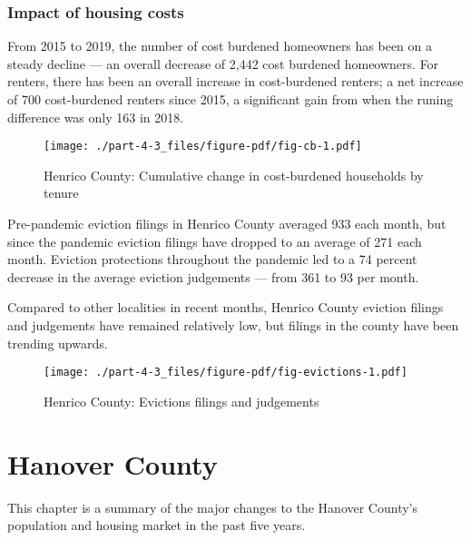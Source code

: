 \documentclass[
  letterpaper,
  DIV=11,
  numbers=noendperiod]{scrreprt}
\begin{document}
\hypertarget{impact-of-housing-costs-2}{%
\subsection{Impact of housing costs}\label{impact-of-housing-costs-2}}

From 2015 to 2019, the number of cost burdened homeowners has been on a
steady decline --- an overall decrease of 2,442 cost burdened
homeowners. For renters, there has been an overall increase in
cost-burdened renters; a net increase of 700 cost-burdened renters since
2015, a significant gain from when the runing difference was only 163 in
2018.

\begin{figure}

{\centering \texttt{[image: ./part-4-3\_files/figure-pdf/fig-cb-1.pdf]}

}

\caption{\label{fig-cb}Henrico County: Cumulative change in
cost-burdened households by tenure}

\end{figure}

Pre-pandemic eviction filings in Henrico County averaged 933 each month,
but since the pandemic eviction filings have dropped to an average of
271 each month. Eviction protections throughout the pandemic led to a 74
percent decrease in the average eviction judgements --- from 361 to 93
per month.

Compared to other localities in recent months, Henrico County eviction
filings and judgements have remained relatively low, but filings in the
county have been trending upwards.

\begin{figure}

{\centering \texttt{[image: ./part-4-3\_files/figure-pdf/fig-evictions-1.pdf]}

}

\caption{\label{fig-evictions}Henrico County: Evictions filings and
judgements}

\end{figure}

\hypertarget{part-4-4}{%
\chapter{Hanover County}\label{part-4-4}}

This chapter is a summary of the major changes to the Hanover County's
population and housing market in the past five years.
\end{document}
